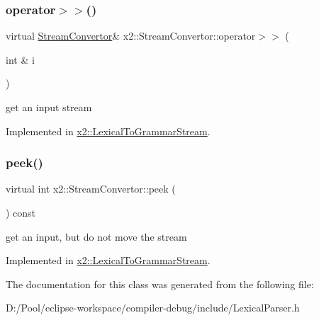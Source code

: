 \subsubsection{\texorpdfstring{operator$>$$>$()}{operator>>()}}
{\footnotesize\ttfamily virtual \hyperlink{classx2_1_1_stream_convertor}{Stream\+Convertor}\& x2\+::\+Stream\+Convertor\+::operator$>$$>$ (\begin{DoxyParamCaption}\item[{int \&}]{i }\end{DoxyParamCaption})\hspace{0.3cm}{\ttfamily [pure virtual]}}

get an input stream 

Implemented in \hyperlink{classx2_1_1_lexical_to_grammar_stream_a7b3d4b7bfc44a17905bae8dc8dcf7a40}{x2\+::\+Lexical\+To\+Grammar\+Stream}.

\mbox{\label{classx2_1_1_stream_convertor_a9bc76cb1b81f1b11c9967f37f01bf2be}} 
\subsubsection{\texorpdfstring{peek()}{peek()}}
{\footnotesize\ttfamily virtual int x2\+::\+Stream\+Convertor\+::peek (\begin{DoxyParamCaption}{ }\end{DoxyParamCaption}) const\hspace{0.3cm}{\ttfamily [pure virtual]}}

get an input, but do not move the stream 

Implemented in \hyperlink{classx2_1_1_lexical_to_grammar_stream_a67a0e2b6ed998fd1dea1c9829be4461f}{x2\+::\+Lexical\+To\+Grammar\+Stream}.



The documentation for this class was generated from the following file\+:\begin{DoxyCompactItemize}
\item 
D\+:/\+Pool/eclipse-\/workspace/compiler-\/debug/include/Lexical\+Parser.\+h\end{DoxyCompactItemize}
